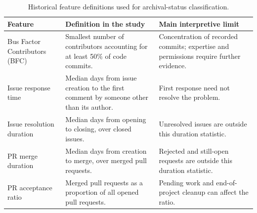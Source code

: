 \begin{table}[tbp]
\caption{Historical feature definitions used for archival-status classification.}
\label{tab:ch8-metrics}
\centering\small\renewcommand{\arraystretch}{1.14}
\begin{tabularx}{\linewidth}{@{}>{\raggedright\arraybackslash}p{30mm}>{\raggedright\arraybackslash}X>{\raggedright\arraybackslash}p{31mm}@{}}\toprule
Feature & Definition in the study & Main interpretive limit\\\midrule
Bus Factor Contributors (BFC) & Smallest number of contributors accounting for at least 50\% of code commits. & Concentration of recorded commits; expertise and permissions require further evidence.\\
Issue response time & Median days from issue creation to the first comment by someone other than its author. & First response need not resolve the problem.\\
Issue resolution duration & Median days from opening to closing, over closed issues. & Unresolved issues are outside this duration statistic.\\
PR merge duration & Median days from creation to merge, over merged pull requests. & Rejected and still-open requests are outside this duration statistic.\\
PR acceptance ratio & Merged pull requests as a proportion of all opened pull requests. & Pending work and end-of-project cleanup can affect the ratio.\\\bottomrule
\end{tabularx}
\end{table}
